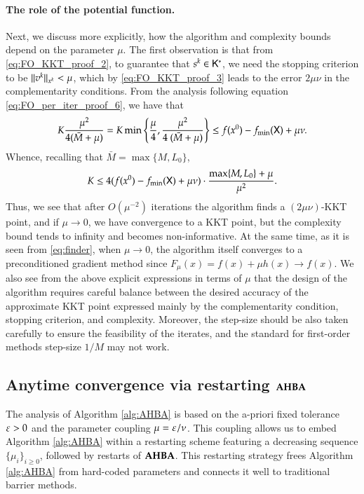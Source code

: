 \paragraph{The role of the potential function.}
Next, we discuss more explicitly, how the algorithm and complexity bounds depend on the parameter $\mu$. The first observation is that from \eqref{eq:FO_KKT_proof_2}, to guarantee that $s^{k} \in \mathsf{K}^{\ast}$, we need the stopping criterion to be $\lVert v^{k}\rVert_{x^k} < \mu$, which by \eqref{eq:FO_KKT_proof_3} leads to the error $2 \mu \nu$ in the complementarity conditions. From the analysis following equation \eqref{eq:FO_per_iter_proof_6}, we have that  
\[
K\frac{\mu^{2}}{4  (\bar{M}+\mu)} = K \min\left\{\frac{\mu}{4},\frac{\mu^{2}}{4 \ (\bar{M}+\mu)}\right\}\leq f(x^{0})-f_{\min}(\mathsf{X})+\mu \nu.
\]
Whence, recalling that $\bar{M}=\max\{M,L_0\}$,
\[
K \leq 4(f(x^{0}) - f_{\min}(\setX)+ \mu \nu) \cdot \frac{\max\{M,L_0\}+\mu}{\mu^{2}}.%
\]
Thus, we see that after $O(\mu^{-2})$ iterations the algorithm finds a $(2 \mu \nu)$-KKT point, and  if $\mu \to 0$, we have convergence to a KKT point, but the complexity bound tends to infinity and becomes non-informative. At the same time, as it is seen from \eqref{eq:finder}, when $\mu \to 0$, the algorithm itself converges to a preconditioned gradient method since $F_{\mu}(x)=f(x) + \mu h(x) \to  f(x)$. 
We also see from the above explicit expressions in terms of $\mu$ that the design of the algorithm requires careful balance between the desired accuracy of the approximate KKT point expressed mainly by the complementarity condition, stopping criterion, and complexity. Moreover, the step-size should be also taken carefully to ensure the feasibility of the iterates, and the standard for first-order methods step-size $1/M$ may not work. 





\subsection{Anytime convergence via restarting $\operatorname{\mathbf{AHBA}}$}
\label{sec:path-following}
The analysis of Algorithm \ref{alg:AHBA} is based on the a-priori fixed tolerance $\varepsilon>0$ and the parameter coupling $\mu=\varepsilon/\nu$. This coupling allows us to embed Algorithm \ref{alg:AHBA} within a restarting scheme featuring a decreasing sequence $\{\mu_{i}\}_{i\geq 0}$, followed by restarts of $\operatorname{\mathbf{AHBA}}$. This restarting strategy frees Algorithm \ref{alg:AHBA} from hard-coded parameters and connects it well to traditional barrier methods.%

